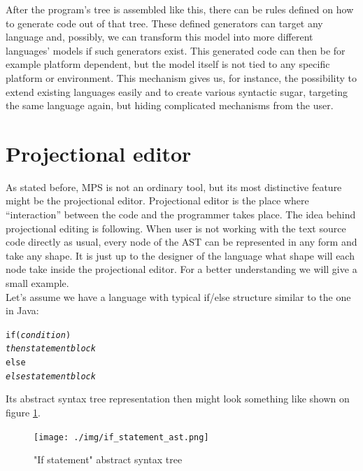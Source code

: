 After the program's tree is assembled like this, there can be rules defined on how to generate code out of that tree. These defined generators can target any language and, possibly, we can transform this model into more different languages' models if such generators exist. This generated code can then be for example platform dependent, but the model itself is not tied to any specific platform or environment. This mechanism gives us, for instance, the possibility to extend existing languages easily and to create various syntactic sugar, targeting the same language again, but hiding complicated mechanisms from the user.

\section{Projectional editor}
As stated before, MPS is not an ordinary tool, but its most distinctive feature might be the projectional editor. Projectional editor is the place where “interaction” between the code and the programmer takes place. The idea behind projectional editing is following. When user is not working with the text source code directly as usual, every node of the AST can be represented in any form and take any shape. It is just up to the designer of the language what shape will each node take inside the projectional editor. For a better understanding we will give a small example. 
\\

Let's assume we have a language with typical if/else structure similar to the one in Java:

\begin{center}
	\begin{minipage}{.38\textwidth}
		\begin{alltt}
			if (\textit{condition}) 
			    \textit{then statement block}
			else
			    \textit{else statement block}
		\end{alltt}
	\end{minipage}
\end{center}

\vspace{3mm}

Its abstract syntax tree representation then might look something like shown on figure \ref{fig:if_ast}.
\\

\begin{figure}[h]
	\centering
	\texttt{[image: ./img/if\_statement\_ast.png]}
	\caption{"If statement" abstract syntax tree}
	\label{fig:if_ast}
\end{figure}

